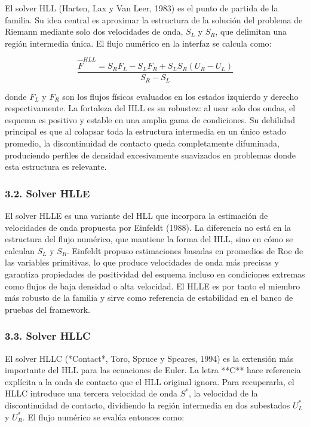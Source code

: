 \documentclass[11pt,openany]{book}
\begin{document}
El solver HLL (Harten, Lax y Van Leer, 1983) es el punto de partida de la familia. Su idea central es aproximar la estructura de la solución del problema de Riemann mediante solo dos velocidades de onda, $S_L$ y $S_R$, que delimitan una región intermedia única. El flujo numérico en la interfaz se calcula como:

\begin{equation}
    \frac{\hat{F}^{HLL} = S_{R}F_{L} - S_{L}F_{R} + S_{L}S_{R}(U_{R} - U_{L})}{S_{R} - S_{L}}
\end{equation}

donde $F_{L}$ y $F_{R}$ son los flujos físicos evaluados en los estados izquierdo y derecho respectivamente. La fortaleza del HLL es su robustez: al usar solo dos ondas, el esquema es positivo y estable en una amplia gama de condiciones. Su debilidad principal es que al colapsar toda la estructura intermedia en un único estado promedio, la discontinuidad de contacto queda completamente difuminada, produciendo perfiles de densidad excesivamente suavizados en problemas donde esta estructura es relevante.

\subsubsection{3.2. Solver HLLE}\textbf{}

El solver HLLE es una variante del HLL que incorpora la estimación de velocidades de onda propuesta por Einfeldt (1988). La diferencia no está en la estructura del flujo numérico, que mantiene la forma del HLL, sino en cómo se calculan $S_{L}$ y $S_{R}$. Einfeldt propuso estimaciones basadas en promedios de Roe de las variables primitivas, lo que produce velocidades de onda más precisas y garantiza propiedades de positividad del esquema incluso en condiciones extremas como flujos de baja densidad o alta velocidad. El HLLE es por tanto el miembro más robusto de la familia y sirve como referencia de estabilidad en el banco de pruebas del framework.

\subsubsection{3.3. Solver HLLC}\textbf{}

El solver HLLC (*Contact*, Toro, Spruce y Speares, 1994) es la extensión más importante del HLL para las ecuaciones de Euler. La letra **C** hace referencia explícita a la onda de contacto que el HLL original ignora. Para recuperarla, el HLLC introduce una tercera velocidad de onda $S^*$, la velocidad de la discontinuidad de contacto, dividiendo la región intermedia en dos subestados $U_{L}^*$ y $U_{R}^*$. El flujo numérico se evalúa entonces como:
\end{document}
